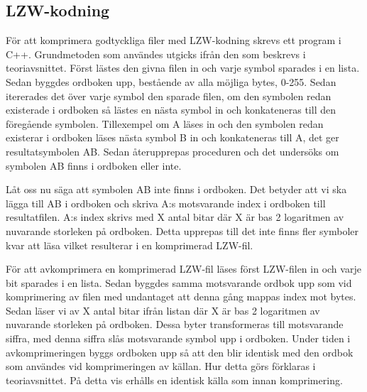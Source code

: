 \subsection{LZW-kodning}
För att komprimera godtyckliga filer med LZW-kodning skrevs ett program i C++. Grundmetoden som användes utgicks ifrån den som beskrevs i teoriavsnittet. Först lästes den givna filen in och varje symbol sparades i en lista. Sedan byggdes ordboken upp, bestående av alla möjliga bytes, 0-255. Sedan itererades det över varje symbol den sparade filen, om den symbolen redan existerade i ordboken så lästes en nästa symbol in och konkateneras till den föregående symbolen. Tillexempel om A läses in och den symbolen redan existerar i ordboken läses nästa symbol B in och konkateneras till A, det ger resultatsymbolen AB. Sedan återupprepas proceduren och det undersöks om symbolen AB finns i ordboken eller inte.

Låt oss nu säga att symbolen AB inte finns i ordboken. Det betyder att vi ska lägga till AB i ordboken och skriva A:s motsvarande index i ordboken till resultatfilen. A:s index skrivs med X antal bitar där X är bas 2 logaritmen av nuvarande storleken på ordboken. Detta upprepas till det inte finns fler symboler kvar att läsa vilket resulterar i en komprimerad LZW-fil.

För att avkomprimera en komprimerad LZW-fil läses först LZW-filen in och varje bit sparades i en lista. Sedan byggdes samma motsvarande ordbok upp som vid komprimering av filen med undantaget att denna gång mappas index mot bytes. Sedan läser vi av X antal bitar ifrån listan där X är bas 2 logaritmen av nuvarande storleken på ordboken. Dessa byter transformeras till motsvarande siffra, med denna siffra slås motsvarande symbol upp i ordboken. Under tiden i avkomprimeringen byggs ordboken upp så att den blir identisk med den ordbok som användes vid komprimeringen av källan. Hur detta görs förklaras i teoriavsnittet. På detta vis erhålls en identisk källa som innan komprimering.



